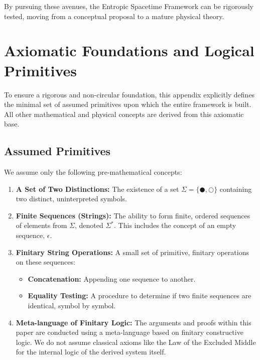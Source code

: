 \documentclass[12pt, a4paper]{article}
\begin{document}
By pursuing these avenues, the Entropic Spacetime Framework can be rigorously tested, moving from a conceptual proposal to a mature physical theory.




\appendix

\section{Axiomatic Foundations and Logical Primitives}
\label{app:axioms}

To ensure a rigorous and non-circular foundation, this appendix explicitly defines the minimal set of assumed primitives upon which the entire framework is built. All other mathematical and physical concepts are derived from this axiomatic base.

\subsection{Assumed Primitives}
We assume only the following pre-mathematical concepts:
\begin{enumerate}
    \item \textbf{A Set of Two Distinctions:} The existence of a set \(\Sigma = \{ \CIRCLE, \Circle \}\) containing two distinct, uninterpreted symbols.
    \item \textbf{Finite Sequences (Strings):} The ability to form finite, ordered sequences of elements from \(\Sigma\), denoted \(\Sigma^*\). This includes the concept of an empty sequence, \(\epsilon\).
    \item \textbf{Finitary String Operations:} A small set of primitive, finitary operations on these sequences:
    \begin{itemize}
        \item \textbf{Concatenation:} Appending one sequence to another.
        \item \textbf{Equality Testing:} A procedure to determine if two finite sequences are identical, symbol by symbol.
    \end{itemize}
    \item \textbf{Meta-language of Finitary Logic:} The arguments and proofs within this paper are conducted using a meta-language based on finitary constructive logic. We do not assume classical axioms like the Law of the Excluded Middle for the internal logic of the derived system itself.
\end{enumerate}
\end{document}
